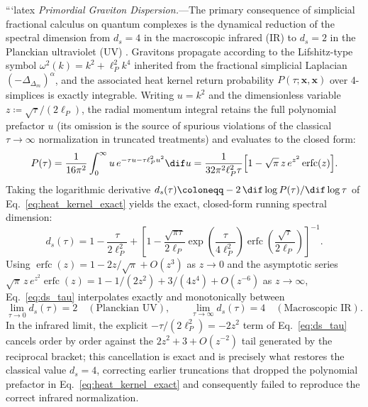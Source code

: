 ```latex
\emph{Primordial Graviton Dispersion.}---The primary consequence of simplicial fractional calculus on quantum complexes is the dynamical reduction of the spectral dimension from $d_s = 4$ in the macroscopic infrared (IR) to $d_s = 2$ in the Planckian ultraviolet (UV) \cite{ambjorn2005spectral, silvafilho2026grand}. Gravitons propagate according to the Lifshitz-type symbol $\omega^2(k) = k^2 + \ell_P^2 k^4$ inherited from the fractional simplicial Laplacian $(-\Delta_{\Delta_m})^\alpha$, and the associated heat kernel return probability $P(\tau; \mathbf{x}, \mathbf{x})$ over 4-simplices is exactly integrable. Writing $u = k^2$ and the dimensionless variable $z \coloneqq \sqrt{\tau}/(2\ell_P)$, the radial momentum integral retains the full polynomial prefactor $u$ (its omission is the source of spurious violations of the classical $\tau \to \infty$ normalization in truncated treatments) and evaluates to the closed form:
\begin{equation}
    \label{eq:heat_kernel_exact}
    P(\tau) = \frac{1}{16\pi^2} \int_0^\infty u\, e^{-\tau u - \tau \ell_P^2 u^2} \dif u = \frac{1}{32\pi^2 \ell_P^2 \tau} \Big[ 1 - \sqrt{\pi}\, z\, e^{z^2} \operatorname{erfc}(z) \Big].
\end{equation}
Taking the logarithmic derivative $d_s(\tau) \coloneqq -2\, \dif \log P(\tau) / \dif \log \tau$ of Eq.~\eqref{eq:heat_kernel_exact} yields the exact, closed-form running spectral dimension:
\begin{equation}
    \label{eq:ds_tau}
    d_s(\tau) = 1 - \frac{\tau}{2\ell_P^2} + \left[ 1 - \frac{\sqrt{\pi \tau}}{2\ell_P} \exp\!\left( \frac{\tau}{4\ell_P^2} \right) \operatorname{erfc}\!\left( \frac{\sqrt{\tau}}{2\ell_P} \right) \right]^{-1}.
\end{equation}
Using $\operatorname{erfc}(z) = 1 - 2z/\sqrt{\pi} + O(z^3)$ as $z \to 0$ and the asymptotic series $\sqrt{\pi}\, z\, e^{z^2} \operatorname{erfc}(z) = 1 - 1/(2z^2) + 3/(4z^4) + O(z^{-6})$ as $z \to \infty$, Eq.~\eqref{eq:ds_tau} interpolates exactly and monotonically between
\begin{equation}
    \label{eq:ds_limits}
    \lim_{\tau \to 0} d_s(\tau) = 2 \quad (\text{Planckian UV}), \qquad \lim_{\tau \to \infty} d_s(\tau) = 4 \quad (\text{Macroscopic IR}).
\end{equation}
In the infrared limit, the explicit $-\tau/(2\ell_P^2) = -2z^2$ term of Eq.~\eqref{eq:ds_tau} cancels order by order against the $2z^2 + 3 + O(z^{-2})$ tail generated by the reciprocal bracket; this cancellation is exact and is precisely what restores the classical value $d_s = 4$, correcting earlier truncations that dropped the polynomial prefactor in Eq.~\eqref{eq:heat_kernel_exact} and consequently failed to reproduce the correct infrared normalization.


